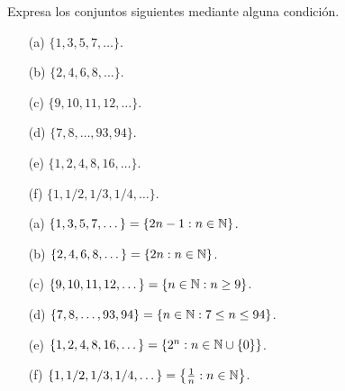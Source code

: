 \documentclass[12pt,a4paper]{article}
\begin{document}
        
    
    \thispagestyle{empty}
    

    \begin{problema}
        Expresa los conjuntos siguientes mediante alguna condición.
        \begin{multicols}{2}
            \begin{enumerate}
                \item[(a)] $\{1,3,5,7,\dots\}$.
                \item[(b)] $\{2,4,6,8,\dots\}$.
                \item[(c)] $\{9,10,11,12,\dots\}$.
                \item[(d)] $\{7,8,\dots,93,94\}$.
                \item[(e)] $\{1,2,4,8,16,\dots\}$.
                \item[(f)] $\{1,1/2,1/3,1/4,\dots\}$.   
            \end{enumerate}
        \end{multicols}
    \end{problema}

    \begin{solucion}
        \begin{multicols}{2}
            \begin{enumerate}
            \item[(a)] $\{1,3,5,7,\dots\}=\{2n-1:n\in\mathbb{N}\}$.
            \item[(b)] $\{2,4,6,8,\dots\}=\{2n:n\in\mathbb{N}\}$.
            \item[(c)] $\{9,10,11,12,\dots\}=\{n\in\mathbb{N}: n\geq9\}$.
            \item[(d)] $\{7,8,\dots,93,94\}=\{n\in\mathbb{N}:7\leq n\leq94\}$.
            \item[(e)] $\{1,2,4,8,16,\dots\}=\{2^{n}:n\in\mathbb{N}\cup\{0\}\}$.
            \item[(f)] $\{1,1/2,1/3,1/4,\dots\}=\left\{\frac{1}{n}:n\in\mathbb{N}\right\}$.  
            \end{enumerate}            
        \end{multicols}
    \end{solucion}
\end{document}
